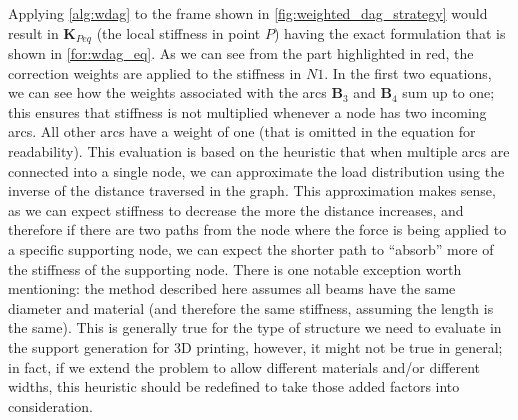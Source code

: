 Applying \cref{alg:wdag} to the frame shown in \cref{fig:weighted_dag_strategy} would result 
in $\mathbf{K}_{Peq}$ (the local stiffness in point $P$) having the exact formulation that is shown in \cref{for:wdag_eq}.
As we can see from the part highlighted in red, the correction weights are applied to the stiffness in $N1$.
In the first two equations, we can see how the weights associated with the arcs $\mathbf{B}_3$ and $\mathbf{B}_4$ sum up to one; this ensures that stiffness is not multiplied whenever a node has two incoming arcs. All other arcs
have a weight of one (that is omitted in the equation for readability).
This evaluation is based on the heuristic that when multiple arcs are connected into a single node,
we can approximate the load distribution using the inverse of the distance traversed in the graph.
This approximation makes sense, as we can expect stiffness to decrease the more the distance increases,
and therefore if there are two paths from the node where the force is being applied to a specific supporting
node, we can expect the shorter path to ``absorb'' more of the stiffness of the supporting node.
There is one notable exception worth mentioning: the method described here assumes all beams
have the same diameter and material (and therefore the same stiffness, assuming the length is the same).
This is generally true for the type of structure we need to evaluate in the support generation for 3D printing,
however, it might not be true in general; in fact, if we extend the problem to allow different materials and/or
different widths, this heuristic should be redefined to take those added factors into consideration.





